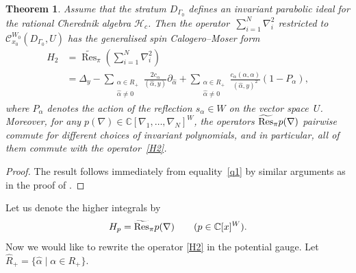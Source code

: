 \documentclass[12pt]{amsart}
\newcommand{\cH}{\mathcal{H}}
\DeclareMathOperator{\Res}{Res}
\numberwithin{equation}{section}
\newtheorem{theorem}{Theorem}[section]
\theoremstyle{definition}
\begin{document}
\begin{theorem}\label{maintheorem}
Assume that the stratum $D_{\Gamma_{0}}$ defines an invariant parabolic ideal for the rational Cherednik algebra $\cH_c$. Then the operator~$\sum_{i = 1}^N \nabla_i^2$ restricted to $\mathcal{C}_{x_0}^{W_0}(D_{\Gamma_0}, U)$
has the generalised spin Calogero--Moser form
\begin{equation}
\label{H2}
\begin{aligned}
    H_2 &= \widetilde{\Res}_{\pi}\left( \sum\limits_{i = 1}^N \nabla_i^2 \right) \\ &=
    \Delta_y - \sum\limits_{\substack{\alpha \in R_+ \\ \widehat{\alpha} \neq 0}}\frac{2 c_{\alpha}}{(\widehat{\alpha} , y)} \partial_{\widehat{\alpha}} + 
    \sum\limits_{\substack{\alpha \in R_{+} \\ \widehat{\alpha} \neq 0}}\frac{c_{\alpha} (\alpha, \alpha)}{(\widehat{\alpha}, y)^2}(1 - P_{\alpha}),
\end{aligned}
\end{equation}
where %
$P_{\alpha}$ denotes the action of the reflection $s_{\alpha} \in W$ on the vector space~$U$. Moreover, for any $p(\nabla) \in \mathbb{C}[\nabla_1, \ldots, \nabla_N]^W$, the operators
$
    \widetilde{\rm Res}_{\pi} p(\nabla)
$
pairwise commute for different choices of invariant polynomials, and in particular, all of them commute with the operator~\eqref{H2}.
\end{theorem}

\begin{proof}
The result follows immediately from equality~\eqref{q1} by similar arguments as in the proof of \cite[Theorem 5]{Feigin}.    
\end{proof}
Let us denote the higher integrals by
\begin{equation}
\label{higherham}
    H_p = \widetilde{\rm Res}_{\pi} p(\nabla) \qquad
    (p \in \mathbb{C}[x]^{W}).
\end{equation}
Now we would like to rewrite the operator \eqref{H2} in the potential gauge. 
Let $\widehat{R}_+ = \{ \widehat{\alpha} \mid \alpha \in R_+\}$.
\end{document}
